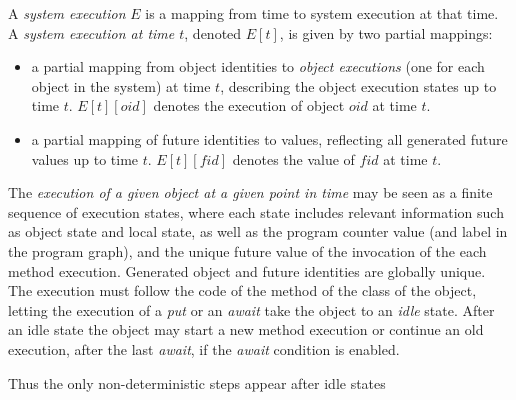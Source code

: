 
\begin{definition}\label{def-ex}

A \emph{system execution} $E$  is a mapping from time to 
system execution at that time.
A \emph{system execution at time $t$}, denoted $E[t]$, is given by two partial mappings:
\begin{itemize} \item 
  a partial mapping from object identities to
  \emph{object executions} (one for each object in the system) at time $t$,
  describing the object execution states %
up to time $t$.
  $E[t][oid]$ denotes the execution of object $oid$ at time $t$.
\item
  a partial mapping of future identities to values, reflecting all
  generated future values up to time $t$.
   $E[t][\mathit{fid}]$ denotes the %
value of $\mathit{fid}$ at time $t$. 
\end{itemize}
%
The \emph{execution of a given object %
at a given point in time} may be seen as a finite sequence of 
execution states, where
each state includes relevant information such as 
object state and local state, as well as the program counter value
(and label in the program graph), and the unique future value of the
invocation of the each %
method execution.
Generated object and future identities are globally unique.
The execution %
must follow the code of the method of the class of the object,
letting the execution of a \emph{put} or an \emph{await}
take the object to an \emph{idle} state.
After an idle state the object may start a new method
execution or continue an old %
 execution, after the last \emph{await},
if the \emph{await} condition is enabled.
%
\end{definition}
Thus the only  non-deterministic steps appear after idle states
